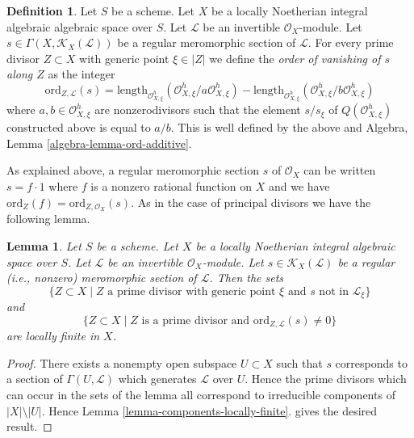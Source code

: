 \documentclass{stacks-project}
\theoremstyle{plain}
\newtheorem{lemma}[subsection]{Lemma}
\theoremstyle{definition}
\newtheorem{definition}[subsection]{Definition}
\theoremstyle{remark}
\numberwithin{equation}{subsection}
\begin{document}
\begin{definition}
\label{definition-order-vanishing-meromorphic}
Let $S$ be a scheme. Let $X$ be a locally Noetherian integral
algebraic algebraic space over $S$. Let $\mathcal{L}$ be an
invertible $\mathcal{O}_X$-module.
Let $s \in \Gamma(X, \mathcal{K}_X(\mathcal{L}))$
be a regular meromorphic section of $\mathcal{L}$.
For every prime divisor $Z \subset X$ with generic point $\xi \in |Z|$
we define the
{\it order of vanishing of $s$ along $Z$}
as the integer
$$
\text{ord}_{Z, \mathcal{L}}(s) =
\text{length}_{\mathcal{O}_{X, \xi}^h}
(\mathcal{O}_{X, \xi}^h/a \mathcal{O}_{X, \xi}^h) -
\text{length}_{\mathcal{O}_{X, \xi}^h}
(\mathcal{O}_{X, \xi}^h/b \mathcal{O}_{X, \xi}^h)
$$
where $a, b \in \mathcal{O}_{X, \xi}^h$ are nonzerodivisors
such that the element $s/s_\xi$ of $Q(\mathcal{O}_{X, \xi}^h)$
constructed above is equal to $a/b$.
This is well defined by the above and
Algebra, Lemma \ref{algebra-lemma-ord-additive}.
\end{definition}

\noindent
As explained above, a regular meromorphic section $s$ of $\mathcal{O}_X$
can be written $s = f \cdot 1$ where $f$
is a nonzero rational function on $X$ and we have
$\text{ord}_Z(f) = \text{ord}_{Z, \mathcal{O}_X}(s)$.
As in the case of principal divisors we have the following lemma.

\begin{lemma}
\label{lemma-divisor-meromorphic-locally-finite}
Let $S$ be a scheme. Let $X$ be a locally Noetherian integral algebraic space
over $S$. Let $\mathcal{L}$ be an invertible $\mathcal{O}_X$-module.
Let $s \in \mathcal{K}_X(\mathcal{L})$ be a
regular (i.e., nonzero) meromorphic section of $\mathcal{L}$. Then the sets
$$
\{Z \subset X \mid Z \text{ a prime divisor with generic point }\xi
\text{ and }s\text{ not in }\mathcal{L}_\xi\}
$$
and
$$
\{Z \subset X \mid Z \text{ is a prime divisor and }
\text{ord}_{Z, \mathcal{L}}(s) \not = 0\}
$$
are locally finite in $X$.
\end{lemma}

\begin{proof}
There exists a nonempty open subspace $U \subset X$ such that $s$
corresponds to a section of $\Gamma(U, \mathcal{L})$ which generates
$\mathcal{L}$ over $U$. Hence the prime divisors which can occur
in the sets of the lemma all correspond to irreducible components of
$|X| \setminus |U|$. Hence Lemma \ref{lemma-components-locally-finite}.
gives the desired result.
\end{proof}
\end{document}
